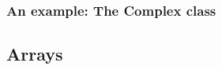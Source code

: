 \documentclass{article}
\begin{document}
\subsubsection{An example: The Complex class}


\subsection{Arrays}


\clearpage







\nocite{*}
\end{document}
